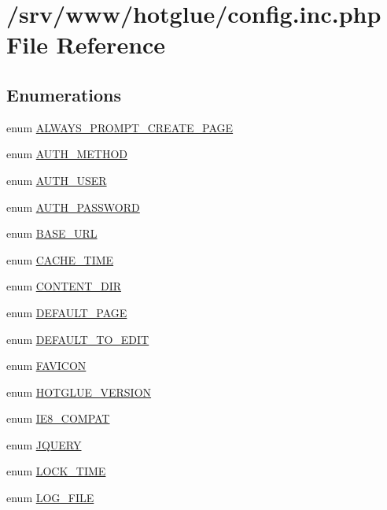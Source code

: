 \hypertarget{config_8inc_8php}{
\section{/srv/www/hotglue/config.inc.php File Reference}
\label{config_8inc_8php}
}
\subsection*{Enumerations}
\begin{DoxyCompactItemize}
\item 
enum \hyperlink{config_8inc_8php_af7115c186e2e18cb1839aed9d163b31a}{ALWAYS\_\-PROMPT\_\-CREATE\_\-PAGE} 
\item 
enum \hyperlink{config_8inc_8php_a2ee7e30fa45253c5e303994703d3293f}{AUTH\_\-METHOD} 
\item 
enum \hyperlink{config_8inc_8php_a7d3a74ff015a9f789a5a2e554a9fa956}{AUTH\_\-USER} 
\item 
enum \hyperlink{config_8inc_8php_adf2112da607b39714ba9cca31b42a93a}{AUTH\_\-PASSWORD} 
\item 
enum \hyperlink{config_8inc_8php_a16548ab75ed30cbddce178d56d26dbb8}{BASE\_\-URL} 
\item 
enum \hyperlink{config_8inc_8php_afc454c0433a87811735836800fe3350b}{CACHE\_\-TIME} 
\item 
enum \hyperlink{config_8inc_8php_a9949c9013641bf07cd112607d200d6ff}{CONTENT\_\-DIR} 
\item 
enum \hyperlink{config_8inc_8php_a4208e17d37801abf0982b2d1e625a8f2}{DEFAULT\_\-PAGE} 
\item 
enum \hyperlink{config_8inc_8php_a3b22c0132666a0112334ed38a21de8ce}{DEFAULT\_\-TO\_\-EDIT} 
\item 
enum \hyperlink{config_8inc_8php_afd55d95ee6651060397404533516882a}{FAVICON} 
\item 
enum \hyperlink{config_8inc_8php_a7c35565a4692ae46fd1c04340f4f1ca9}{HOTGLUE\_\-VERSION} 
\item 
enum \hyperlink{config_8inc_8php_a1d76a949b348522c90864da5df468d51}{IE8\_\-COMPAT} 
\item 
enum \hyperlink{config_8inc_8php_a5c2fff7e41a0380fb7872627e3a14a29}{JQUERY} 
\item 
enum \hyperlink{config_8inc_8php_a924ae40271cc363050158e36b3823407}{LOCK\_\-TIME} 
\item 
enum \hyperlink{config_8inc_8php_a6de83433b64b24349644a4c2d839dcb7}{LOG\_\-FILE} 
\item 

\end{DoxyCompactItemize}
